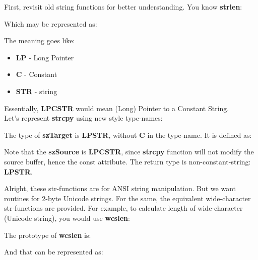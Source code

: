 	First, revisit old string functions for better understanding. You know \textbf{strlen}:\\
	
	
	Which may be represented as:
	
	
	The meaning goes like:
	
	\begin{itemize}
		\item \textbf{LP} - Long Pointer
		\item \textbf{C} - Constant
		\item \textbf{STR} - string
	\end{itemize}
	
	Essentially, \textbf{LPCSTR} would mean (Long) Pointer to a Constant String.\\
	
	Let's represent \textbf{strcpy} using new style type-names:\\
	
	
	The type of \textbf{szTarget} is \textbf{LPSTR}, without \textbf{C} in the type-name. It is defined as:
	
	
	Note that the \textbf{szSource} is \textbf{LPCSTR}, since \textbf{strcpy} function will not modify the source buffer, hence the const attribute. The return type is non-constant-string: \textbf{LPSTR}.
	
	Alright, these str-functions are for ANSI string manipulation. But we want routines for 2-byte Unicode strings. For the same, the equivalent wide-character str-functions are provided. For example, to calculate length of wide-character (Unicode string), you would use \textbf{wcslen}:\\
	
	
	The prototype of \textbf{wcslen} is:\\
	
	
	And that can be represented as:\\
	
